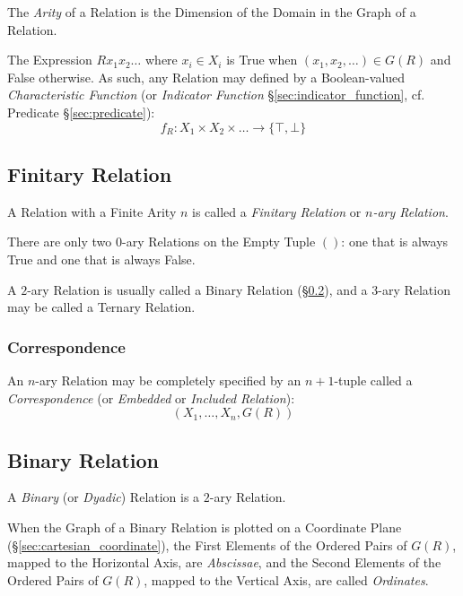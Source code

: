 The \emph{Arity} of a Relation is the Dimension of the Domain in the
Graph of a Relation. %

The Expression $R x_1 x_2 \ldots$ where $x_i \in X_i$ is True when
$(x_1, x_2, \ldots) \in G(R)$ and False otherwise. As such, any
Relation may defined by a Boolean-valued \emph{Characteristic
  Function} (or \emph{Indicator Function}
\S\ref{sec:indicator_function}, cf. Predicate \S\ref{sec:predicate}):
\[
  f_R : X_1 \times X_2 \times \ldots \rightarrow \{\top,\bot\}
\]


\subsection{Finitary Relation}\label{sec:finitary_relation}

A Relation with a Finite Arity $n$ is called a \emph{Finitary
  Relation} or \emph{$n$-ary Relation}.

There are only two $0$-ary Relations on the Empty Tuple $()$: one that
is always True and one that is always False.

A $2$-ary Relation is usually called a Binary Relation
(\S\ref{sec:binary_relation}), and a $3$-ary Relation may be called a
Ternary Relation.



\subsubsection{Correspondence}\label{sec:correspondence}

An $n$-ary Relation may be completely specified by an $n + 1$-tuple
called a \emph{Correspondence} (or \emph{Embedded} or \emph{Included
  Relation}):
\[
  (X_1, \ldots, X_n, G(R))
\]



\subsection{Binary Relation}\label{sec:binary_relation}

A \emph{Binary} (or \emph{Dyadic}) Relation is a $2$-ary Relation.

When the Graph of a Binary Relation is plotted on a Coordinate Plane
(\S\ref{sec:cartesian_coordinate}), the First Elements of the Ordered
Pairs of $G(R)$, mapped to the Horizontal Axis, are \emph{Abscissae},
and the Second Elements of the Ordered Pairs of $G(R)$, mapped to the
Vertical Axis, are called \emph{Ordinates}.

